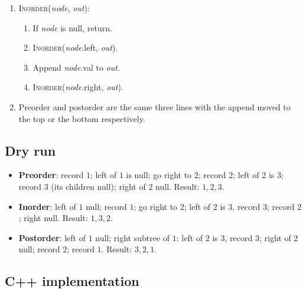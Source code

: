 \begin{enumerate}
  \item \textsc{Inorder}(\textit{node}, \textit{out}):
  \begin{enumerate}
    \item If \textit{node} is null, return.
    \item \textsc{Inorder}(\textit{node}.left, \textit{out}).
    \item Append \textit{node}.val to \textit{out}.
    \item \textsc{Inorder}(\textit{node}.right, \textit{out}).
  \end{enumerate}
  \item Preorder and postorder are the same three lines with the append
        moved to the top or the bottom respectively.
\end{enumerate}

\subsection*{Dry run}


\begin{itemize}
  \item \textbf{Preorder}: record $1$; left of $1$ is null; go right to
        $2$; record $2$; left of $2$ is $3$; record $3$ (its children
        null); right of $2$ null. Result: $1,2,3$.
  \item \textbf{Inorder}: left of $1$ null; record $1$; go right to $2$;
        left of $2$ is $3$, record $3$; record $2$; right null. Result:
        $1,3,2$.
  \item \textbf{Postorder}: left of $1$ null; right subtree of $1$: left
        of $2$ is $3$, record $3$; right of $2$ null; record $2$; record
        $1$. Result: $3,2,1$.
\end{itemize}

\subsection*{C++ implementation}

